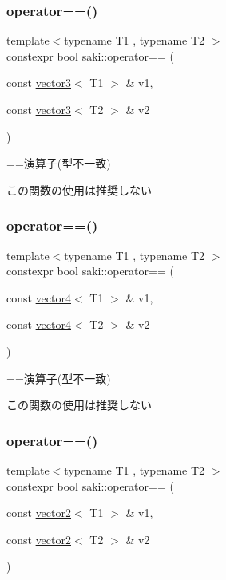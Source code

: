 \subsubsection{\texorpdfstring{operator==()}{operator==()}\hspace{0.1cm}{\footnotesize\ttfamily [7/14]}}
{\footnotesize\ttfamily template$<$typename T1 , typename T2 $>$ \\
constexpr bool saki\+::operator== (\begin{DoxyParamCaption}\item[{const \mbox{\hyperlink{classsaki_1_1vector3}{vector3}}$<$ T1 $>$ \&}]{v1,  }\item[{const \mbox{\hyperlink{classsaki_1_1vector3}{vector3}}$<$ T2 $>$ \&}]{v2 }\end{DoxyParamCaption})}



==演算子(型不一致) 

この関数の使用は推奨しない \mbox{\label{namespacesaki_af2a10e5e2974f482b6da75d9137dc143}} 
\subsubsection{\texorpdfstring{operator==()}{operator==()}\hspace{0.1cm}{\footnotesize\ttfamily [8/14]}}
{\footnotesize\ttfamily template$<$typename T1 , typename T2 $>$ \\
constexpr bool saki\+::operator== (\begin{DoxyParamCaption}\item[{const \mbox{\hyperlink{classsaki_1_1vector4}{vector4}}$<$ T1 $>$ \&}]{v1,  }\item[{const \mbox{\hyperlink{classsaki_1_1vector4}{vector4}}$<$ T2 $>$ \&}]{v2 }\end{DoxyParamCaption})}



==演算子(型不一致) 

この関数の使用は推奨しない \mbox{\label{namespacesaki_a07efea0cf7385fc13c00519e8f0f7732}} 
\subsubsection{\texorpdfstring{operator==()}{operator==()}\hspace{0.1cm}{\footnotesize\ttfamily [9/14]}}
{\footnotesize\ttfamily template$<$typename T1 , typename T2 $>$ \\
constexpr bool saki\+::operator== (\begin{DoxyParamCaption}\item[{const \mbox{\hyperlink{classsaki_1_1vector2}{vector2}}$<$ T1 $>$ \&}]{v1,  }\item[{const \mbox{\hyperlink{classsaki_1_1vector2}{vector2}}$<$ T2 $>$ \&}]{v2 }\end{DoxyParamCaption})}



